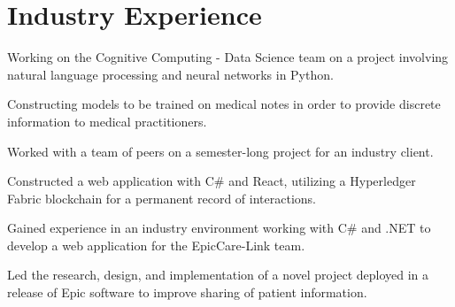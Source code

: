 \documentclass[]{deedy-resume-openfont-rileyannis}
\begin{document}
\begin{minipage}[t]{0.66\textwidth} 


\section{Industry Experience}

\vspace{\topsep} %
\begin{tightemize}
\item Working on the Cognitive Computing - Data Science team on a project involving natural language processing and neural networks in Python.
\item Constructing models to be trained on medical notes in order to provide discrete information to medical practitioners.
\end{tightemize}
\sectionsep

\begin{tightemize}
\item Worked with a team of peers on a semester-long project for an industry client.
\item Constructed a web application with C\# and React, utilizing a Hyperledger Fabric blockchain for a permanent record of interactions.
\end{tightemize}
\sectionsep

\begin{tightemize}
\item Gained experience in an industry environment working with C\# and .NET to develop a web application for the EpicCare-Link team.
\item Led the research, design, and implementation of a novel project deployed in a release of Epic software to improve sharing of patient information.
\end{tightemize}
\sectionsep



\end{minipage}
\end{document}

